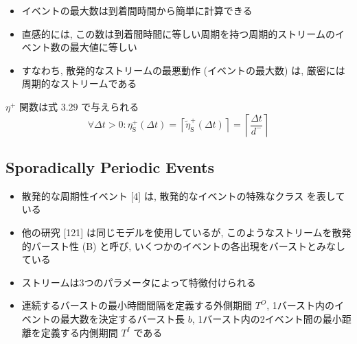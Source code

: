 \begin{frame}{}
    \begin{itemize}
        \item イベントの最大数は到着間時間から簡単に計算できる
        \item 直感的には, この数は到着間時間に等しい周期を持つ周期的ストリームのイベント数の最大値に等しい
        \item すなわち, 散発的なストリームの最悪動作 (イベントの最大数) は, 厳密には周期的なストリームである
    \end{itemize}
\end{frame}

\begin{frame}{}
\end{frame}

\begin{frame}{}
    $\eta^{+}$ 関数は式 $3.29$ で与えられる
    \begin{equation*}
        \forall \Delta t>0: \eta_{\mathrm{S}}^{+}(\Delta t)=\left\lceil\tilde{\eta}_{\mathrm{S}}^{+}(\Delta t)\right\rceil=\left\lceil\frac{\Delta t}{d^{-}}\right\rceil
    \end{equation*}
\end{frame}


\subsection{Sporadically Periodic Events}
\label{ssec: sporadically periodic events}

\begin{frame}{}
    \begin{itemize}
        \item 散発的な周期性イベント [4] は, 散発的なイベントの特殊なクラス を表している
        \item 他の研究 [121] は同じモデルを使用しているが, このようなストリームを散発的バースト性 (B) と呼び, いくつかのイベントの各出現をバーストとみなしている
    \end{itemize}
\end{frame}

\begin{frame}{}
    \begin{itemize}
        \item ストリームは3つのパラメータによって特徴付けられる
        \item 連続するバーストの最小時間間隔を定義する外側期間 $T^{O}$, 1バースト内のイベントの最大数を決定するバースト長 $b$, 1バースト内の2イベント間の最小距離を定義する内側期間 $T^{I}$ である
    \end{itemize}
\end{frame}

